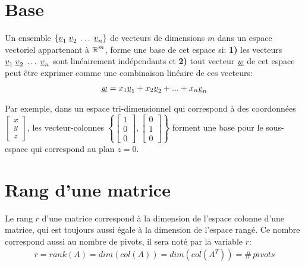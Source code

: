 \section{Base}
\label{sec:base}

Un ensemble $\{ \underline{v}_1 \; \underline{v}_2 \; \hdots \; \underline{v}_n \}$ de vecteurs de dimensions $m$ dans un espace vectoriel appartenant à $\operatorname{\mathbb{R}}^m$, forme une base de cet espace si: \textbf{1)} les vecteurs $\underline{v}_1 \; \underline{v}_2 \; \hdots \; \underline{v}_n$ sont linéairement indépendants et \textbf{2)} tout vecteur $\underline{w}$ de cet espace peut être exprimer comme une combinaison linéaire de ces vecteurs:
\begin{align}
\underline{w} = x_1 \underline{v}_1 + x_2 \underline{v}_2 + ... + x_n \underline{v}_n
\end{align}

Par exemple, dans un espace tri-dimensionnel qui correspond à des coordonnées $
\left[
\begin{array}{c}
x \\ y \\ z
\end{array}
\right]
$, les vecteur-colonnes $\left\{ 
\left[
\begin{array}{c}
1 \\ 0 \\ 0
\end{array}
\right],
\left[
\begin{array}{c}
0 \\ 1 \\ 0
\end{array}
\right]
\right\}$
forment une base pour le sous-espace qui correspond au plan $z=0$.

\section{Rang d'une matrice}
\label{sec:rang}

Le rang $r$ d'une matrice correspond à la dimension de l'espace colonne d'une matrice, qui est toujours aussi égale à la dimension de l'espace rangé. Ce nombre correspond aussi au nombre de pivots, il sera noté par la variable $r$:
\begin{align}
r = rank( A ) = dim( col(A) ) = dim( col(A^T) ) =\#\, pivots
\end{align}


